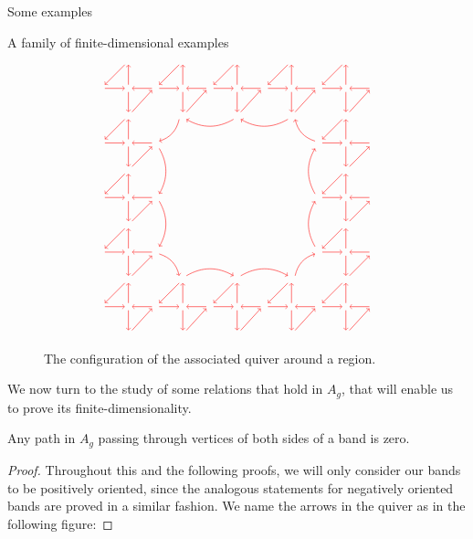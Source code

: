 \begin{chapter}{Some examples}
\begin{section}{A family of finite-dimensional examples}
\begin{figure}[h]
\[\begin{tikzpicture}
\foreach \x in {-3.75,-2.25,...,2.25}
{
\draw[->, red] (\x+0.85, -0.65) -- (\x+1.4, -0.05);
\draw[->, red] (\x+1.4, 0) -- (\x+0.85, 0);
\draw[->, red] (\x+0.75, -0.1) -- (\x+0.75, -0.65);
\draw[->, red] (\x+0.85, -6.65) -- (\x+1.4, -6.05);
\draw[->, red] (\x+1.4, -6) -- (\x+0.85, -6);
\draw[->, red] (\x+0.75, -6.1) -- (\x+0.75, -6.65);

\draw[->, red] (\x+0.75, 0.1) -- (\x+0.75, 0.65);
\draw[->, red] (\x+0.65, 0.65) -- (\x+0.1, 0.1);
\draw[->, red] (\x+0.1, 0) -- (\x+0.65, 0);
\draw[->, red] (\x+0.75, -5.9) -- (\x+0.75, -5.35);
\draw[->, red] (\x+0.65, -5.35) -- (\x+0.1, -5.9);
\draw[->, red] (\x+0.1, -6) -- (\x+0.65, -6);
}

\foreach \x in {-0.75,-2.25,-3.75}
{
\draw[->, red] (-2.35, \x-0.75) -- (-2.9, \x-0.75);
\draw[->, red] (-3, \x-0.85) -- (-3, \x-1.4);
\draw[->, red] (-2.9, \x-1.4) -- (-2.35, \x-0.85);
\draw[->, red] (3.65, \x-0.75) -- (3.1, \x-0.75);
\draw[->, red] (3, \x-0.85) -- (3, \x-1.4);
\draw[->, red] (3.1, \x-1.4) -- (3.65, \x-0.85);

\draw[->, red] (-3, \x-0.65) -- (-3, \x-0.1);
\draw[->, red] (-3.1, \x-0.1) -- (-3.65, \x-0.65);
\draw[->, red] (-3.65, \x-0.75) -- (-3.1, \x-0.75);
\draw[->, red] (3, \x-0.65) -- (3, \x-0.1);
\draw[->, red] (2.9, \x-0.1) -- (2.35, \x-0.65);
\draw[->, red] (2.35, \x-0.75) -- (2.9, \x-0.75);
}

\draw[<-, red] (-1.4, -0.85) to [bend right] (-0.1, -0.85);
\draw[<-, red] (0.1, -0.85) to [bend right] (1.4, -0.85);
\draw[->,  red] (-1.4, -5.15) to [bend left] (-0.1, -5.15);
\draw[->, red] (0.1, -5.15) to [bend left] (1.4, -5.15);

\draw[->, red] (-2.15, -1.65) to [bend left] (-2.15, -2.9);
\draw[->, red] (-2.15, -3.1) to [bend left] (-2.15, -4.35);
\draw[<-, red] (2.15, -1.65) to [bend right] (2.15, -2.9);
\draw[<-, red] (2.15, -3.1) to [bend right] (2.15, -4.35);

\draw[->, red] (-1.6, -0.85) to [bend left] (-2.15, -1.45);
\draw[->, red] (-2.15, -4.55) to [bend left] (-1.6, -5.15);
\draw[<-, red] (1.6, -0.85) to [bend right] (2.15, -1.45);
\draw[<-, red] (2.15, -4.55) to [bend right] (1.6, -5.15);
\end{tikzpicture}
\]
\caption{The configuration of the associated quiver around a region.}
\end{figure}
We now turn to the study of some relations that hold in $A_g$, that will enable us to prove its finite-dimensionality.

\begin{lemma}\label{band-sides} Any path in $A_g$ passing through vertices of both sides of a band is zero.
\end{lemma}
\begin{proof} Throughout this and the following proofs, we will only consider our bands to be positively oriented, since the analogous statements for negatively oriented bands are proved in a similar fashion. We name the arrows in the quiver as in the following figure:


\end{proof}
\end{section}
\end{chapter}
